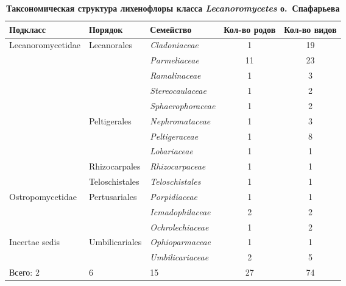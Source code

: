 \begin{table}[h!]
\caption*{\textbf{Таксономическая структура лихенофлоры класса \textit{Lecanoromycetes} о.~Спафарьева}}
\label{tab:zhelydeva}
\begin{center}


\begin{tabular}{lllcc}
   \toprule
Подкласс          & Порядок                  & Семейство                 &  \parbox[c][4em][c]{0.1\textwidth}{ \centering Кол-во родов} & \parbox[c][4em][c]{0.1\textwidth}{ \centering Кол-во видов} \\
 \midrule
Lecanoromycetidae & Lecanorales              & \textit{Cladoniaceae}     & 1                & 19               \\
                  &                          & \textit{Parmeliaceae}    & 11                & 23               \\
                  &                          & \textit{Ramalinaceae}     & 1                & 3                \\
                  &                          & \textit{Stereocaulaceae}  & 1                & 2                \\
                  &                          & \textit{Sphaerophoraceae} & 1                & 2                \\
                  & Peltigerales             & \textit{Nephromataceae}   & 1                & 3                \\
                  &                          & \textit{Peltigeraceae}    & 1                & 8                \\
                  &                          & \textit{Lobariaceae}      & 1                & 1                \\
                  & Rhizocarpales            & \textit{Rhizocarpaceae}   & 1                & 1                \\
                  & Teloschistales           & \textit{Teloschistales}   & 1                & 1                \\
 \midrule
Ostropomycetidae  & Pertusariales            & \textit{Porpidiaceae}     & 1                & 1                \\
                  &                          & \textit{Icmadophilaceae}  & 2                 & 2                \\
                  &                          & \textit{Ochrolechiaceae}  & 1                & 2                \\
 \midrule
Incertae sedis    & Umbilicariales           & \textit{Ophioparmaceae}   & 1                & 1                \\
                  &                          & \textit{Umbilicariaceae}  & 2                & 5                \\
 \midrule
Всего: 2          & 6                        & 15                        & 27               & 74\\
\bottomrule

\end{tabular}
\end{center}
\end{table}

